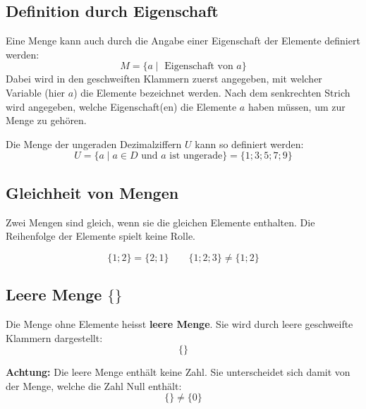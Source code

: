 \subsection{Definition durch Eigenschaft}

Eine Menge kann auch durch die Angabe einer Eigenschaft der Elemente definiert werden:
\[
  M = \{ a \mid \text{ Eigenschaft von } a\}
\]
Dabei wird in den geschweiften Klammern zuerst angegeben, mit welcher Variable (hier $a$) die Elemente bezeichnet werden. Nach dem senkrechten Strich wird angegeben, welche Eigenschaft(en) die Elemente $a$ haben müssen, um zur Menge zu gehören.
\begin{example}
  Die Menge der ungeraden Dezimalziffern $U$ kann so definiert werden:
  \[
    U = \{ a \mid a \in D \text{ und } a \text{ ist ungerade} \} = \{ 1; 3; 5; 7; 9 \}
  \]
\end{example}

\subsection{Gleichheit von Mengen}
Zwei Mengen sind gleich, wenn sie die gleichen Elemente enthalten. Die Reihenfolge der Elemente spielt keine Rolle.
\begin{example}
  \[
    \{1;2\} = \{2;1\} \qquad \{1;2;3\} \neq \{1;2\}
  \]
\end{example}

\subsection{Leere Menge $\{\}$}
Die Menge ohne Elemente heisst \textbf{leere Menge}. Sie wird durch leere geschweifte Klammern dargestellt:
\[
  \{ \}
\]
\begin{note}
  \textbf{Achtung:} Die leere Menge enthält keine Zahl. Sie unterscheidet sich damit von der Menge, welche die Zahl Null enthält:
  \[
    \{\} \neq \{0\}
  \]
\end{note}

